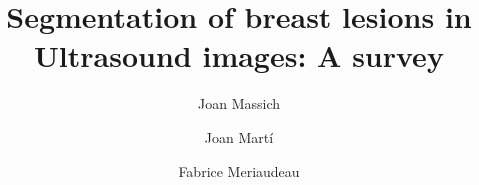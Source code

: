 \documentclass[authoryear,preprint,review,12pt]{elsarticle}
\begin{document}
\newcommand{\autoGuidedColor}{(light-Blue)}
\newcommand{\fullyAutoColor}{(dark-blue)}
\newcommand{\semiAutoColor}{(light-green)}
\newcommand{\fullyGuidedColor}{(dark-green)}

\begin{frontmatter}
 



\title{%
Segmentation of breast lesions in Ultrasound images: A survey
}
\author[udg,ub]{Joan Massich}
\author[udg]{Joan Mart\'{i}}
\author[ub]{Fabrice Meriaudeau}



\address[udg]{Computer Vision and Robotics Group, Universitat de Girona, Campus Montilivi, Edifici PIV, s/n, 17071 Girona, Spain}
\address[ub]{Le2i-UMR CNRS 6306, Université de Bourgogne, 12 rue de la Fonderie, 712000 Le Creusot, France}

\begin{abstract}



\end{abstract}
\end{frontmatter}
\end{document}
